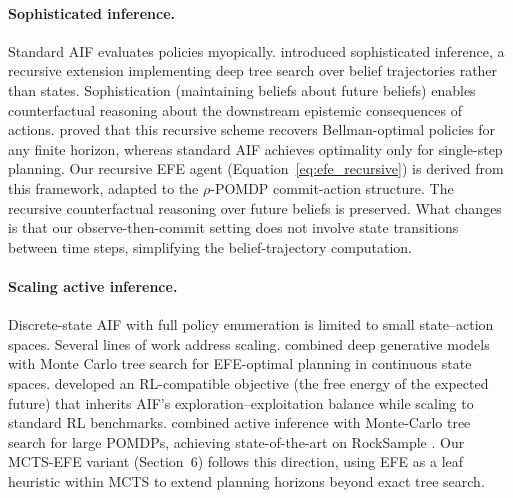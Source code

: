 \documentclass[runningheads]{llncs}
\begin{document}
\paragraph{Sophisticated inference.}
Standard AIF evaluates policies myopically. \citet{friston2021} introduced sophisticated inference, a recursive extension implementing deep tree search over belief trajectories rather than states. Sophistication (maintaining beliefs about future beliefs) enables counterfactual reasoning about the downstream epistemic consequences of actions. \citet{dacosta2020b} proved that this recursive scheme recovers Bellman-optimal policies for any finite horizon, whereas standard AIF achieves optimality only for single-step planning. Our recursive EFE agent (Equation~\ref{eq:efe_recursive}) is derived from this framework, adapted to the $\rho$-POMDP commit-action structure. The recursive counterfactual reasoning over future beliefs is preserved. What changes is that our observe-then-commit setting does not involve state transitions between time steps, simplifying the belief-trajectory computation.

\paragraph{Scaling active inference.}
Discrete-state AIF with full policy enumeration is limited to small state--action spaces. Several lines of work address scaling. \citet{fountas2020} combined deep generative models with Monte Carlo tree search for EFE-optimal planning in continuous state spaces. \citet{tschantz2020} developed an RL-compatible objective (the free energy of the expected future) that inherits AIF's exploration--exploitation balance while scaling to standard RL benchmarks. \citet{maisto2025} combined active inference with Monte-Carlo tree search for large POMDPs, achieving state-of-the-art on RockSample \citep{smith2004}. Our MCTS-EFE variant (Section~6) follows this direction, using EFE as a leaf heuristic within MCTS to extend planning horizons beyond exact tree search.
\end{document}
